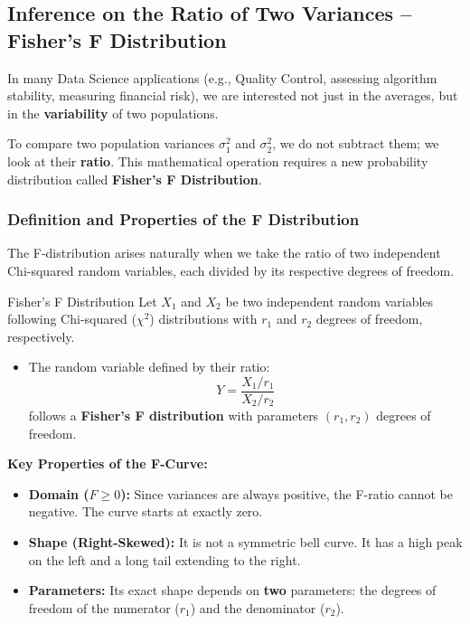 \subsection{Inference on the Ratio of Two Variances -- Fisher's F Distribution}

In many Data Science applications (e.g., Quality Control, assessing algorithm stability, measuring financial risk), we are interested not just in the averages, but in the \textbf{variability} of two populations. 

To compare two population variances $\sigma_1^2$ and $\sigma_2^2$, we do not subtract them; we look at their \textbf{ratio}. This mathematical operation requires a new probability distribution called \textbf{Fisher's F Distribution}.

\subsubsection{Definition and Properties of the F Distribution}

The F-distribution arises naturally when we take the ratio of two independent Chi-squared random variables, each divided by its respective degrees of freedom.

\begin{defbox}{Fisher's F Distribution}
Let $X_1$ and $X_2$ be two independent random variables following Chi-squared ($\chi^2$) distributions with $r_1$ and $r_2$ degrees of freedom, respectively.

\begin{itemize}
    \item The random variable defined by their ratio:
    \begin{equation}
        Y = \frac{X_1 / r_1}{X_2 / r_2} 
    \end{equation} 
    follows a \textbf{Fisher's F distribution} with parameters $(r_1, r_2)$ degrees of freedom.
\end{itemize}
\end{defbox}

\vspace{0.2cm}
\textbf{Key Properties of the F-Curve:}
\begin{itemize}
    \item \textbf{Domain ($F \ge 0$):} Since variances are always positive, the F-ratio cannot be negative. The curve starts at exactly zero.
    \item \textbf{Shape (Right-Skewed):} It is not a symmetric bell curve. It has a high peak on the left and a long tail extending to the right.
    \item \textbf{Parameters:} Its exact shape depends on \textbf{two} parameters: the degrees of freedom of the numerator ($r_1$) and the denominator ($r_2$).
\end{itemize}

